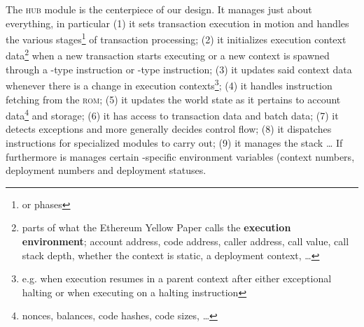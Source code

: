 The \textsc{hub} module is the centerpiece of our \zkEvm{} design.
It manages just about everything, in particular
(1) it sets transaction execution in motion and handles the various stages\footnote{or phases} of transaction processing;
(2) it initializes execution context data\footnote{parts of what the Ethereum Yellow Paper \cite{EYP} calls the \textbf{execution environment}; account address, code address, caller address, call value, call stack depth, whether the context is static, a deployment context, \dots{}} when a new transaction starts executing or a new context is spawned through a -type instruction or -type instruction;
(3) it updates said context data whenever there is a change in execution contexts\footnote{e.g. when execution resumes in a parent context after either exceptional halting or when executing on a halting instruction};
(4) it handles instruction fetching from the \textsc{rom};
(5) it updates the world state as it pertains to account data\footnote{nonces, balances, code hashes, code sizes, \dots{}} and storage;
(6) it has access to transaction data and batch data;
(7) it detects exceptions and more generally decides control flow;
(8) it dispatches instructions for specialized modules to carry out;
(9) it manages the stack \dots{}
If furthermore is manages certain \zkEvm{}-specific environment variables (context numbers, deployment numbers and deployment statuses.
